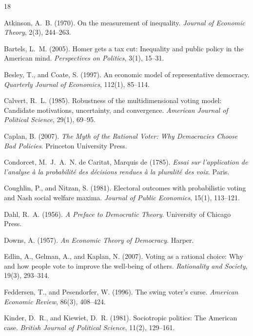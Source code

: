 \documentclass[11pt]{article}
\begin{document}
\begin{thebibliography}{18}
\itemsep2pt

Atkinson, A.~B. (1970). On the measurement of inequality. \emph{Journal
of Economic Theory}, 2(3), 244--263.

Bartels, L.~M. (2005). Homer gets a tax cut: Inequality and public policy
in the American mind. \emph{Perspectives on Politics}, 3(1), 15--31.

Besley, T., and Coate, S. (1997). An economic model of representative
democracy. \emph{Quarterly Journal of Economics}, 112(1), 85--114.

Calvert, R.~L. (1985). Robustness of the multidimensional voting model:
Candidate motivations, uncertainty, and convergence. \emph{American
Journal of Political Science}, 29(1), 69--95.

Caplan, B. (2007). \emph{The Myth of the Rational Voter: Why Democracies
Choose Bad Policies}. Princeton University Press.

Condorcet, M.~J.~A.~N. de Caritat, Marquis de (1785). \emph{Essai sur
l'application de l'analyse \`a la probabilit\'e des d\'ecisions rendues
\`a la pluralit\'e des voix}. Paris.

Coughlin, P., and Nitzan, S. (1981). Electoral outcomes with probabilistic
voting and Nash social welfare maxima. \emph{Journal of Public Economics},
15(1), 113--121.

Dahl, R.~A. (1956). \emph{A Preface to Democratic Theory}. University of
Chicago Press.

Downs, A. (1957). \emph{An Economic Theory of Democracy}. Harper.

Edlin, A., Gelman, A., and Kaplan, N. (2007). Voting as a rational
choice: Why and how people vote to improve the well-being of others.
\emph{Rationality and Society}, 19(3), 293--314.

Feddersen, T., and Pesendorfer, W. (1996). The swing voter's curse.
\emph{American Economic Review}, 86(3), 408--424.

Kinder, D.~R., and Kiewiet, D.~R. (1981). Sociotropic politics: The
American case. \emph{British Journal of Political Science}, 11(2),
129--161.


\end{thebibliography}
\end{document}

